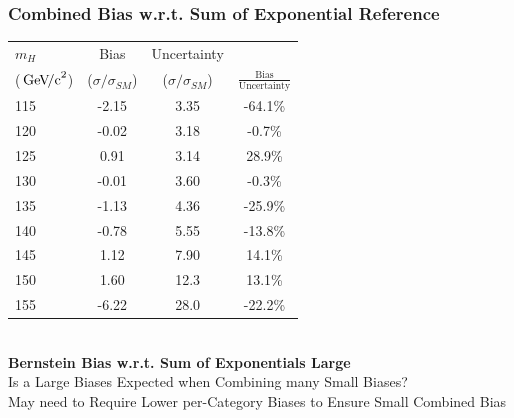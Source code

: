 \documentclass{beamer}
\newcommand{\GeVcc}{\ensuremath{\,\mathrm{Ge\kern -0.1em V\!/c}^2}}
\begin{document}
\begin{frame}
\frametitle{Combined Bias w.r.t. Sum of Exponential Reference}
  \begin{center}
    \scriptsize
    \begin{tabular}{|l|c|c|c|} \hline
$m_H$         & Bias & Uncertainty & \\ 
(\GeVcc{})         & ($\sigma/\sigma_{SM}$) & ($\sigma/\sigma_{SM}$) & $\frac{\mathrm{Bias}}{\mathrm{Uncertainty}}$ \\ \hline \hline
115   &      -2.15  &       3.35      &    -64.1\%    \\ \hline
120   &      -0.02  &       3.18      &     -0.7\%    \\ \hline
125   &       0.91  &       3.14      &     28.9\%    \\ \hline
130   &      -0.01  &       3.60      &     -0.3\%    \\ \hline
135   &      -1.13  &       4.36      &    -25.9\%    \\ \hline
140   &      -0.78  &       5.55      &    -13.8\%    \\ \hline
145   &       1.12  &       7.90      &     14.1\%    \\ \hline
150   &       1.60  &      12.3       &     13.1\%    \\ \hline
155   &      -6.22  &      28.0       &    -22.2\%    \\ \hline
    \end{tabular}
\\
  \small
\normalsize
\vspace{1em}
\textbf{Bernstein Bias w.r.t. Sum of Exponentials Large}
\\
Is a Large Biases Expected when Combining many Small Biases?
\\
May need to Require Lower per-Category Biases to Ensure Small Combined Bias
  \end{center}
\end{frame}
\end{document}
